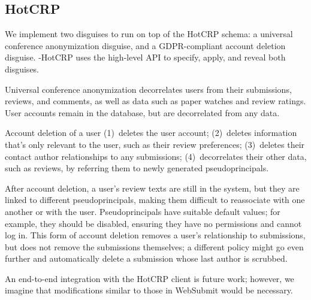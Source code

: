 \subsection{HotCRP}
We implement two disguises to run on top of the HotCRP schema: a universal conference anonymization
disguise, and a GDPR-compliant account deletion disguise.  \sys-HotCRP uses the high-level \sys API
to specify, apply, and reveal both disguises.

Universal conference anonymization decorrelates users from their submissions, reviews, and comments,
as well as data such as paper watches and review ratings. User accounts remain in the database, but
are decorrelated from any data.

 Account deletion of a user 
%
(1)~deletes the user account;
%
(2)~deletes information that's only relevant to the user, such as their review preferences;
%
(3)~deletes their contact author relationships to any submissions;
%
(4)~decorrelates their other data, such as reviews, by referring them to newly generated
pseudoprincipals.

After account deletion, a user's review texts are still in the system, but they are linked to
different pseudoprincipals, making them difficult to reassociate with one another or with the user.
%
Pseudoprincipals have suitable default values; for example, they should be disabled, ensuring they
have no permissions and cannot log in.
%
This form of account deletion removes a user's relationship to submissions, but does not remove the
submissions themselves; a different policy might go even further and automatically delete a
submission whose last author is scrubbed.

An end-to-end integration with the
HotCRP client is future work; however, we imagine that modifications similar to those in WebSubmit
would be necessary.

